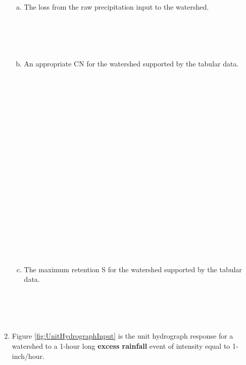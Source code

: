\documentclass[12pt]{article}
\begin{document}
\begin{enumerate}
\begin{enumerate}[a)]
\item The loss from the raw precipitation input to the watershed.\\
~\\
~\\
~\\
~\\
\clearpage
\item An appropriate CN for the watershed supported by the tabular data.\\
~\\
~\\
~\\
~\\
~\\
~\\
~\\
~\\
~\\
~\\
~\\
~\\
~\\
~\\
~\\
~\\
~\\
~\\
~\\
\item The maximum retention S for the watershed supported by the tabular data.\\
~\\
~\\
~\\
~\\
\end{enumerate}

\clearpage

\item Figure \ref{fig:UnitHydrographInput} is the unit hydrograph response for a watershed to a 1-hour long \textbf{excess rainfall} event of intensity equal to 1-inch/hour.  


\end{enumerate}
\end{document}
